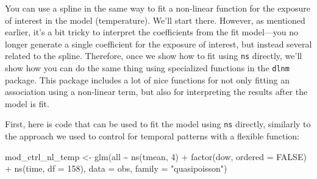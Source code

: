\documentclass[
]{book}
\newenvironment{Shaded}{\begin{snugshade}}{\end{snugshade}}
\newcommand{\AttributeTok}[1]{\textcolor[rgb]{0.77,0.63,0.00}{#1}}
\newcommand{\ConstantTok}[1]{\textcolor[rgb]{0.00,0.00,0.00}{#1}}
\newcommand{\DecValTok}[1]{\textcolor[rgb]{0.00,0.00,0.81}{#1}}
\newcommand{\FloatTok}[1]{\textcolor[rgb]{0.00,0.00,0.81}{#1}}
\newcommand{\FunctionTok}[1]{\textcolor[rgb]{0.00,0.00,0.00}{#1}}
\newcommand{\NormalTok}[1]{#1}
\newcommand{\OtherTok}[1]{\textcolor[rgb]{0.56,0.35,0.01}{#1}}
\newcommand{\SpecialCharTok}[1]{\textcolor[rgb]{0.00,0.00,0.00}{#1}}
\newcommand{\StringTok}[1]{\textcolor[rgb]{0.31,0.60,0.02}{#1}}
\begin{document}
You can use a spline in the same way to fit a non-linear function for the
exposure of interest in the model (temperature). We'll start there. However,
as mentioned earlier, it's a bit tricky to interpret the coefficients from the
fit model---you no longer generate a single coefficient for the exposure of
interest, but instead several related to the spline. Therefore, once we show
how to fit using \texttt{ns} directly, we'll show how you can do the same thing using
specialized functions in the \texttt{dlnm} package. This package includes a lot of
nice functions for not only fitting an association using a non-linear term,
but also for interpreting the results after the model is fit.

First, here is code that can be used to fit the model using \texttt{ns} directly,
similarly to the approach we used to control for temporal patterns with a
flexible function:

\begin{Shaded}
\begin{Highlighting}[]
\NormalTok{mod\_ctrl\_nl\_temp }\OtherTok{\textless{}{-}} \FunctionTok{glm}\NormalTok{(all }\SpecialCharTok{\textasciitilde{}} \FunctionTok{ns}\NormalTok{(tmean, }\DecValTok{4}\NormalTok{) }\SpecialCharTok{+} \FunctionTok{factor}\NormalTok{(dow, }\AttributeTok{ordered =} \ConstantTok{FALSE}\NormalTok{) }\SpecialCharTok{+}
                          \FunctionTok{ns}\NormalTok{(time, }\AttributeTok{df =} \DecValTok{158}\NormalTok{), }
                        \AttributeTok{data =}\NormalTok{ obs, }\AttributeTok{family =} \StringTok{"quasipoisson"}\NormalTok{)}
\end{Highlighting}
\end{Shaded}

\begin{Shaded}
\end{Shaded}
\end{document}
